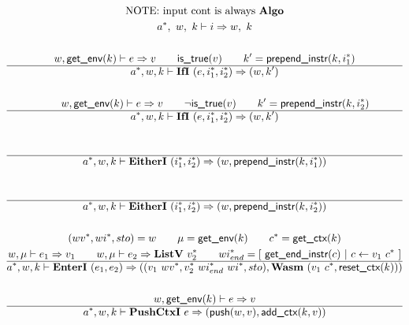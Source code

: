 \begin{gather*}
  \text{NOTE: input cont is always \algo} \\
  \seq{a}, ~ w, ~ k \vdash i \Rightarrow w, ~ k \\
%
\newline \\
  w, \getenv(k) \vdash e \Rightarrow v \qquad
  \istrue(v) \qquad k' = \prependinstr(k, \seq{i_1}) \\
  \hline
  \seq{a}, w, k \vdash \ifi ~ (e, \seq{i_1}, \seq{i_2}) \Rightarrow (w, k') \\
%
\newline \\
  \qquad w, \getenv(k) \vdash e \Rightarrow v \qquad
  \neg \istrue(v) \qquad k' = \prependinstr(k, \seq{i_2}) \\
  \hline
  \seq{a}, w, k \vdash \ifi ~ (e, \seq{i_1}, \seq{i_2}) \Rightarrow (w, k') \\
%
\newline \\
  \\
  \hline
  \seq{a}, w, k \vdash \eitheri ~ (\seq{i_1}, \seq{i_2}) \Rightarrow (w, \prependinstr(k, \seq{i_1})) \\
%
\newline \\
  \\
  \hline
  \seq{a}, w, k \vdash \eitheri ~ (\seq{i_1}, \seq{i_2}) \Rightarrow (w, \prependinstr(k, \seq{i_2})) \\
%
\newline \\
  (\seq{wv}, \seq{wi}, sto) = w \qquad
  \mu = \getenv(k) \qquad
  \seq c = \getctx(k) \\
  w, \mu \vdash e_1 \Rightarrow v_1 \qquad
  w, \mu \vdash e_2 \Rightarrow \listv ~ \seq{v_2} \qquad
  \seq{wi_{end}} = [ ~ \getendinstr(c) ~ | ~ c \leftarrow v_1 ~ \seq c ~ ] \\
  \hline
  \seq{a}, w, k \vdash \enteri ~ (e_1, e_2)
  \Rightarrow
  ((v_1 ~ \seq{wv}, \seq{v_2} ~ \seq{wi_{end}}~ \seq{wi}, sto), \wasm ~ (v_1 ~ \seq c, \resetctx(k))) \\
%
\newline \\
  w, \getenv(k) \vdash e \Rightarrow v \\
  \hline
  \seq{a}, w, k \vdash \pushctxi ~ e
  \Rightarrow
  (\push(w, v), \addctx(k, v)) \\
%
\newline \\

\end{gather*}
